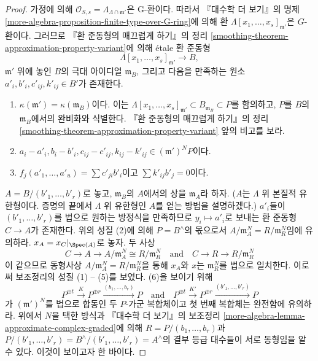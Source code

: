 \begin{proof}
\medskip\noindent
가정에 의해 $\mathcal{O}_{S, s} = \Lambda_{\Lambda \cap \mathfrak m'}$은
G-환이다. 따라서 『대수학 더 보기』의 명제
\ref{more-algebra-proposition-finite-type-over-G-ring}에 의해 환
$\Lambda[x_1, \ldots, x_s]_{\mathfrak m'}$은 $G$-환이다.
그러므로 『환 준동형의 매끄럽게 하기』의 정리
\ref{smoothing-theorem-approximation-property-variant}에 의해
\'etale 환 준동형
$$
\Lambda[x_1, \ldots, x_s]_{\mathfrak m'} \to B,
$$
$\mathfrak m'$ 위에 놓인 $B$의 극대 아이디얼 $\mathfrak m_B$, 그리고
다음을 만족하는 원소 $a'_i, b'_i, c'_{ij}, k'_{ij} \in B'$가 존재한다.
\begin{enumerate}
\item $\kappa(\mathfrak m') = \kappa(\mathfrak m_B)$이다. 이는
$\Lambda[x_1, \ldots, x_s]_{\mathfrak m'} \subset B_{\mathfrak m_B}
\subset P$를 함의하고, $P$를 $B$의 $\mathfrak m_B$에서의 완비화와
식별한다. 『환 준동형의 매끄럽게 하기』의 정리
\ref{smoothing-theorem-approximation-property-variant} 앞의 비고를 보라.
\item $a_i - a'_i, b_i - b'_i, c_{ij} - c'_{ij}, k_{ij} - k'_{ij} \in
(\mathfrak m')^N P$이다.
\item $f_j(a'_1, \ldots, a'_u) = \sum c'_{ji} b'_i$이고
$\sum k'_{ij}b'_j = 0$이다.
\end{enumerate}
$A = B/(b'_1, \ldots, b'_r)$로 놓고, $\mathfrak m_B$의 $A$에서의
상을 $\mathfrak m_A$라 하자.
($A$는 $\Lambda$ 위 본질적 유한형이다. 증명의 끝에서 $\Lambda$ 위
유한형인 $A$를 얻는 방법을 설명하겠다.) $a'_i$들이
$(b'_1, \ldots, b'_r)$를 법으로 원하는 방정식을 만족하므로
$y_i \mapsto a'_i$로 보내는 환 준동형 $C \to A$가 존재한다.
위의 성질 (2)에 의해 $P = B^\wedge$의 몫으로서
$A/\mathfrak m_A^N = R/\mathfrak m_R^N$임에 유의하라.
$x_A = x_C|_{\Spec(A)}$로 놓자. 두 사상
$$
C \to A \to A/\mathfrak m_A^N \cong R/\mathfrak m_R^N
\quad\text{and}\quad
C \to R \to R/\mathfrak m_R^N
$$
이 같으므로 동형사상
$A/\mathfrak m_A^N = R/\mathfrak m_R^N$을 통해 $x_A$와 $x$는
$\mathfrak m_R^N$를 법으로 일치한다. 이로써 보조정리의 성질
(1) -- (5)를 보였다. (6)을 보이기 위해
$$
P^{\oplus t} \xrightarrow{K}
P^{\oplus r} \xrightarrow{(b_1, \ldots, b_r)}
P
\quad\text{and}\quad
P^{\oplus t} \xrightarrow{K'}
P^{\oplus r} \xrightarrow{(b'_1, \ldots, b'_r)}
P
$$
가 $(\mathfrak m')^N$를 법으로 합동인 두 $P$-가군 복합체이고 첫 번째
복합체는 완전함에 유의하라. 위에서 $N$을 택한 방식과
『대수학 더 보기』의 보조정리
\ref{more-algebra-lemma-approximate-complex-graded}에 의해
$R = P/(b_1, \ldots, b_r)$과
$P/(b'_1, \ldots, b'_r) = B^\wedge/(b'_1, \ldots, b'_r) = A^\wedge$의
결부 등급 대수들이 서로 동형임을 알 수 있다. 이것이 보이고자 한 바이다.


\end{proof}
